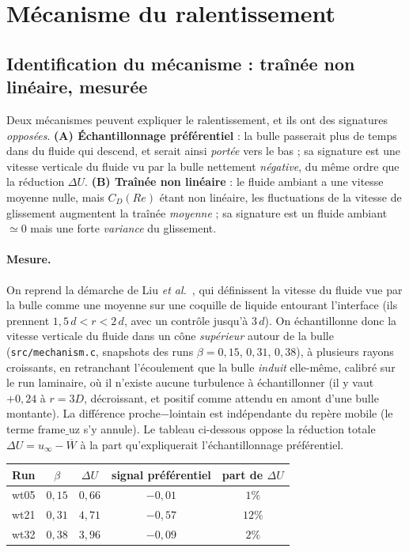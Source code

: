 \section{Mécanisme du ralentissement}

\subsection{Identification du mécanisme : traînée non linéaire, mesurée}
\label{subsec:mecanisme}

Deux mécanismes peuvent expliquer le ralentissement, et ils ont des signatures
\emph{opposées}. \textbf{(A) Échantillonnage préférentiel} : la bulle passerait plus de
temps dans du fluide qui descend, et serait ainsi \emph{portée} vers le bas ; sa
signature est une vitesse verticale du fluide vu par la bulle nettement \emph{négative},
du même ordre que la réduction $\Delta U$. \textbf{(B) Traînée non linéaire}
\cite{liu2024} : le fluide ambiant a une vitesse moyenne nulle, mais $C_D(Re)$ étant
non linéaire, les fluctuations de la vitesse de glissement augmentent la traînée
\emph{moyenne} ; sa signature est un fluide ambiant $\simeq0$ mais une forte
\emph{variance} du glissement.

\paragraph{Mesure.} On reprend la démarche de Liu \emph{et al.}~\cite{liu2024}, qui
définissent la vitesse du fluide \og{}vue\fg{} par la bulle comme une moyenne sur une
coquille de liquide entourant l'interface (ils prennent $1{,}5\,d < r < 2\,d$, avec un
contrôle jusqu'à $3\,d$). On échantillonne donc la vitesse verticale du fluide dans un
cône \emph{supérieur} autour de la bulle (\texttt{src/mechanism.c}, snapshots des runs
$\beta=0{,}15$, $0{,}31$, $0{,}38$), à plusieurs rayons croissants, en retranchant
l'écoulement que la bulle \emph{induit} elle-même, calibré sur le run laminaire, où il n'existe aucune
turbulence à échantillonner (il y vaut $+0{,}24$ à $r=3D$, décroissant, et positif comme
attendu en amont d'une bulle montante). La différence proche$-$lointain est indépendante
du repère mobile (le terme $\mathrm{frame\_uz}$ s'y annule). Le tableau ci-dessous oppose
la réduction totale $\Delta U = u_\infty - \overline{W}$ à la part qu'expliquerait
l'échantillonnage préférentiel.

\begin{center}
\renewcommand{\arraystretch}{1.25}
\begin{tabular}{lcccc}
    \toprule
    Run & $\beta$ & $\Delta U$ & signal préférentiel & part de $\Delta U$ \\
    \midrule
    wt05 & $0{,}15$ & $0{,}66$ & $-0{,}01$ & $1\%$ \\
    wt21 & $0{,}31$ & $4{,}71$ & $-0{,}57$ & $12\%$ \\
    wt32 & $0{,}38$ & $3{,}96$ & $-0{,}09$ & $2\%$ \\
    \bottomrule
\end{tabular}
\end{center}

